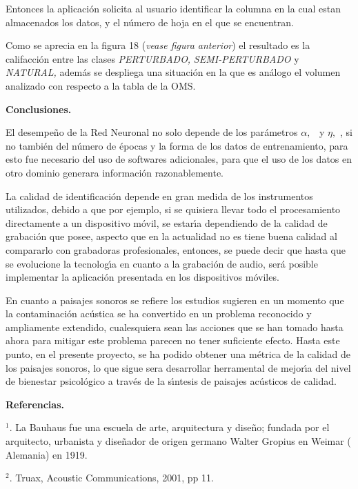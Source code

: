 Entonces la aplicaci\'{o}n solicita al usuario identificar la columna en la
cual estan almacenados los datos, y el n\'{u}mero de hoja en el que se encuentran.

Como se aprecia en la figura 18 (\textit{vease figura anterior}) el resultado
es la califacci\'{o}n entre las clases \textit{PERTURBADO,}
\textit{SEMI-PERTURBADO} y \textit{NATURAL, }adem\'{a}s se despliega una
situaci\'{o}n en la que es an\'{a}logo el volumen analizado con respecto a la
tabla de la OMS.

\textbf{Conclusiones.}

El desempe\~{n}o de la Red Neuronal no solo depende de los par\'{a}metros
$\alpha,$ \ y $\eta,$ , si no tambi\'{e}n del n\'{u}mero de \'{e}pocas y la
forma de los datos de entrenamiento, para esto fue necesario del uso de
softwares adicionales, para que el uso de los datos en otro dominio generara
informaci\'{o}n razonablemente.

La calidad de identificaci\'{o}n depende en gran medida de los instrumentos
utilizados, debido a que por ejemplo, si se quisiera llevar todo el
procesamiento directamente a un dispositivo m\'{o}vil, se estar\'{\i}a
dependiendo de la calidad de grabaci\'{o}n que posee, aspecto que en la
actualidad no es tiene buena calidad al compararlo con grabadoras
profesionales, entonces, se puede decir que hasta que se evolucione la
tecnolog\'{\i}a en cuanto a la grabaci\'{o}n de audio, ser\'{a} posible
implementar la aplicaci\'{o}n presentada en los dispositivos m\'{o}viles.

En cuanto a paisajes sonoros se refiere los estudios sugieren en un momento
que la contaminaci\'{o}n ac\'{u}stica se ha convertido en un problema
reconocido y ampliamente extendido, cualesquiera sean las acciones que se han
tomado hasta ahora para mitigar este problema parecen no tener suficiente
efecto. Hasta este punto, en el presente proyecto, se ha podido obtener una
m\'{e}trica de la calidad de los paisajes sonoros, lo que sigue sera
desarrollar herramental de mejor\'{\i}a del nivel de bienestar psicol\'{o}gico
a trav\'{e}s de la s\'{\i}ntesis de paisajes ac\'{u}sticos de calidad.

\textbf{Referencias.}

$^{1}$. La Bauhaus fue una escuela de arte, arquitectura y dise\~{n}o; fundada
por el arquitecto, urbanista y dise\~{n}ador de origen germano Walter Gropius
en Weimar ( Alemania) en 1919.

$^{2}$. Truax, Acoustic Communications, 2001, pp 11.

